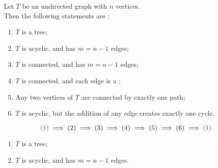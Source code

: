 \begin{frame}{}
  \begin{theorem}
    Let $T$ be an undirected graph with $n$ vertices. \\[3pt]
    Then the following statements are :
    \begin{enumerate}[(1)]
      \setlength{\itemsep}{6pt}
      \item $T$ is a tree;
      \item $T$ is acyclic, and has $m = n-1$ edges;
      \item $T$ is connected, and has $m = n-1$ edges;
      \item $T$ is connected, and each edge is a ;
      \item Any two vertices of $T$ are connected by exactly one path;
      \item $T$ is acyclic, but the addition of any edge creates exactly one cycle.
    \end{enumerate}
  \end{theorem}

  \pause
  \[
    \textcolor{red}{(1)} \implies (2) \implies (3) \implies (4) \implies (5) \implies (6) \implies \textcolor{red}{(1)}
  \]
\end{frame}

\begin{frame}{}
  \begin{theorem}
    \begin{enumerate}[(1)]
        \setlength{\itemsep}{6pt}
        \item $T$ is a tree;
        \item $T$ is acyclic, and has $m = n-1$ edges.
    \end{enumerate}
  \end{theorem}

  \pause
  \begin{center}
  \end{center}

  \begin{description}
    \setlength{\itemsep}{8pt}
    \item[Basis Step:]
    \item[Induction Hypothesis:]
    \item[Induction Step:]
  \end{description}
\end{frame}

